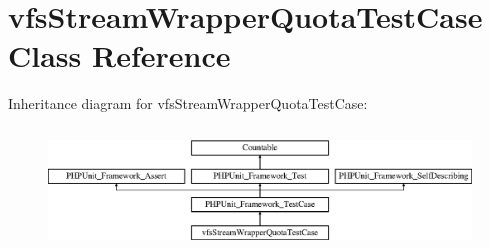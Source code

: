 \hypertarget{classorg_1_1bovigo_1_1vfs_1_1vfs_stream_wrapper_quota_test_case}{}\section{vfs\+Stream\+Wrapper\+Quota\+Test\+Case Class Reference}
\label{classorg_1_1bovigo_1_1vfs_1_1vfs_stream_wrapper_quota_test_case}
Inheritance diagram for vfs\+Stream\+Wrapper\+Quota\+Test\+Case\+:\begin{figure}[H]
\begin{center}
\leavevmode
\includegraphics[height=3.303835cm]{classorg_1_1bovigo_1_1vfs_1_1vfs_stream_wrapper_quota_test_case}
\end{center}
\end{figure}
